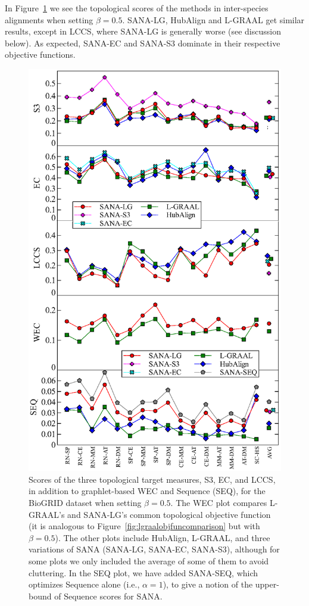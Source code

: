 \documentclass{bioinfo}
\begin{document}
In Figure~\ref{fig:biogrid_beta0,5} we see the topological scores of the methods in inter-species alignments when setting $\beta=0.5$. SANA-LG, HubAlign and L-GRAAL get similar results, except in LCCS, where SANA-LG is generally worse (see discussion below). As expected, SANA-EC and SANA-S3 dominate in their respective objective functions.

\begin{figure}
\centering
\includegraphics[width=0.99\linewidth]{biogridBeta05.eps}
\caption{Scores of the three topological target measures, S3, EC, and LCCS, in addition to graphlet-based WEC and Sequence (SEQ), for the BioGRID dataset when setting $\beta=0.5$. The WEC plot compares L-GRAAL's and SANA-LG's common topological objective function (it is analogous to Figure~\ref{fig:lgraalobjfuncomparison} but with $\beta=0.5$). The other plots include HubAlign, L-GRAAL, and three variations of SANA (SANA-LG, SANA-EC, SANA-S3), although for some plots we only included the average of some of them to avoid cluttering. In the SEQ plot, we have added SANA-SEQ, which optimizes Sequence alone (i.e., $\alpha=1$), to give a notion of the upper-bound of Sequence scores for SANA.}
\label{fig:biogrid_beta0,5}
\end{figure}
\end{document}
